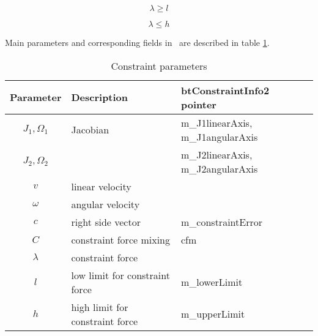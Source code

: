 \begin{equation} \label{eq:lambdaLow}
\lambda \geq l
\end{equation}

\begin{equation} \label{eq:lambdaHigh}
\lambda \leq h
\end{equation}

Main parameters  and corresponding fields in \bullet\  
 are described in table \ref{tab:constraintParameters}.

\begin {table}[htb!]
\begin{center}
\begin{tabular}{|c| l| l|}
\hline
{\bf Parameter} & {\bf Description} & {\bf btConstraintInfo2 pointer}\\  \hline
$J_1, \Omega_1$ & Jacobian & m\_J1linearAxis, m\_J1angularAxis \\ 
$J_2, \Omega_2$ & & m\_J2linearAxis, m\_J2angularAxis \\ \hline
$v$ & linear velocity & \\ \hline
$\omega$ & angular velocity & \\ \hline
$c$        &  right side vector   & m\_constraintError \\ \hline
$C$  & constraint force mixing & cfm \\  \hline
$\lambda$ & constraint force &  \\ \hline
$l$ & low limit for constraint force & m\_lowerLimit \\ \hline
$h$ & high limit for constraint force & m\_upperLimit \\ \hline
\end {tabular}
\end{center}
\caption {Constraint parameters} \label{tab:constraintParameters} 
\end {table}
